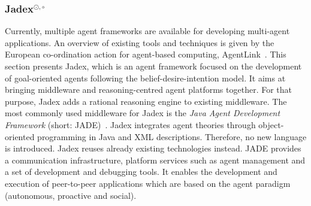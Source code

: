 \subsubsection[Jadex]{Jadex$^{\odot,\circ}$}\label{fun:apl_jadex}
Currently, multiple agent frameworks are available for developing multi-agent applications.
An overview of existing tools and techniques is given by the European co-ordination action for agent-based computing, AgentLink~\cite{Mangina}. %
This section presents Jadex, which is an agent framework focused on the development of goal-oriented agents following the belief-desire-intention model.
It aims at bringing middleware and reasoning-centred agent platforms together.
For that purpose, Jadex adds a rational reasoning engine to existing middleware.
The most commonly used middleware for Jadex is the \emph{Java Agent Development Framework} (short: JADE)~\cite{bellifemine_jade_2005}. %
Jadex integrates agent theories through object-oriented programming in Java and XML descriptions.
Therefore, no new language is introduced.
Jadex reuses already existing technologies instead.
JADE provides a communication infrastructure, platform services such as agent management and a set of development and debugging tools.
It enables the development and execution of peer-to-peer applications which are based on the agent paradigm (autonomous, proactive and social). %

